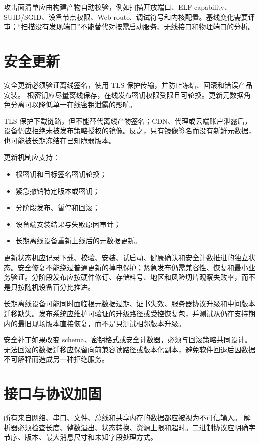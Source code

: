 攻击面清单应由构建产物自动校验，例如扫描开放端口、ELF capability、SUID/SGID、设备节点权限、Web route、调试符号和内核配置。基线变化需要评审；“扫描没有发现端口”不能替代对按需启动服务、无线接口和物理端口的分析。

\section{安全更新}

安全更新必须验证离线签名，使用 TLS 保护传输，并防止冻结、回滚和错误产品安装。
根密钥应尽量离线保存，在线发布密钥权限受限且可轮换。更新元数据角色分离可以降低单一在线密钥泄露的影响\cite{tuf-spec}。

TLS 保护下载链路，但不能替代离线产物签名；CDN、代理或云端账户泄露后，设备仍应拒绝未被发布策略授权的镜像。反之，只有镜像签名而没有新鲜元数据，也可能被长期冻结在已知脆弱版本。

更新机制应支持：
\begin{itemize}
  \item 根密钥和目标签名密钥轮换；
  \item 紧急撤销特定版本或密钥；
  \item 分阶段发布、暂停和回滚；
  \item 设备端安装结果与失败原因审计；
  \item 长期离线设备重新上线后的元数据更新。
\end{itemize}

更新状态机应记录下载、校验、安装、试启动、健康确认和安全计数推进的独立状态。安全修复不能绕过普通更新的掉电保护；紧急发布仍需兼容性、恢复和最小业务验证。分阶段发布应按硬件修订、存储料号、地区和风险切片观察失败率，而不是只按随机设备百分比推进。

长期离线设备可能同时面临根元数据过期、证书失效、服务器协议升级和中间版本迁移缺失。发布系统应维护可验证的升级路径或受控恢复包，并测试从仍在支持期内的最旧现场版本直接恢复，而不是只测试相邻版本升级。

安全补丁如果改变 schema、密钥格式或安全计数器，必须与回滚策略共同设计。无法回滚的数据迁移应保留向前兼容读路径或版本化副本，避免软件回退后因数据不可解释而造成另一种拒绝服务。

\section{接口与协议加固}

所有来自网络、串口、文件、总线和共享内存的数据都应被视为不可信输入。
解析器必须检查长度、整数溢出、状态转换、资源上限和超时。二进制协议应明确字节序、版本、最大消息尺寸和未知字段处理方式。

